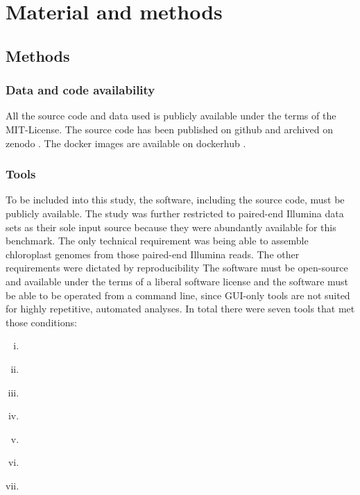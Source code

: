 \section{Material and methods}
\subsection{Methods}
\subsubsection{Data and code availability}
All the source code and data used is publicly available under the terms of the MIT-License. The source code
has been published on github \cite{github-benchmark-repo} and archived on zenodo \cite{zenodorepo} . The
docker images are available on dockerhub \cite{dockerhub-benchmark}.

\subsubsection{Tools}
To be included into this study, the software, including the source code, must be publicly
available. The study was further restricted to paired-end Illumina data sets as their sole
input source because they were abundantly available for this benchmark.  The only
technical requirement was being able to assemble chloroplast genomes from those paired-end
Illumina reads. The other requirements were dictated by reproducibility The software must
be open-source and available under the terms of a liberal software license and the
software must be able to be operated from a command line, since GUI-only tools are not
suited for highly repetitive, automated analyses. In total there were seven tools that met
those conditions:

\begin{enumerate}[(i)]
\item \ce \hspace{0.25ex} \cite{j_ankenbrand_chloroextractor:_2018}
\item \cassp \hspace{0.25ex} \cite{sancho_comparative_2018}
\item \go \hspace{0.25ex} \cite{jin_getorganelle:_2018}
\item \oa \hspace{0.25ex} \cite{coissac_barcodes_2016}
\item \ioga \hspace{0.25ex} \cite{bakker_herbarium_2016}
\item \fp \hspace{0.25ex} \cite{mckain__fast-plast_2017}
\item \np \hspace{0.25ex} \cite{dierckxsens_novoplasty:_2017}
\end{enumerate}


